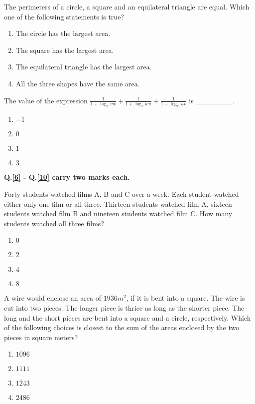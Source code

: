     \item The perimeters of a circle, a square and an equilateral triangle are equal. Which one of the following statements is true?
        \begin{enumerate}
            \item The circle has the largest area.
            \item The square has the largest area.
            \item The equilateral triangle has the largest area.
            \item All the three shapes have the same area.
        \end{enumerate}

    \item \label{5} The value of the expression $\frac{1}{1 + \log_u vw} + \frac{1}{1 + \log_v wu} + \frac{1}{1 + \log_w uv}$ is \_\_\_\_\_\_\_.
        \begin{enumerate}
            \item $-1$
            \item $0$
            \item $1$
            \item $3$
        \end{enumerate}

        \item[] \textbf{Q.\ref{6} - Q.\ref{10} carry two marks each.}
    \item \label{6} Forty students watched films A, B and C over a week. Each student watched either only one film or all three. Thirteen students watched film A, sixteen students watched film B and nineteen students watched film C. How many students watched all three films?
        \begin{enumerate}
            \item $0$
            \item $2$
            \item $4$
            \item $8$
        \end{enumerate}

    \item A wire would enclose an area of $1936 m^2$, if it is bent into a square. The wire is cut into two pieces. The longer piece is thrice as long as the shorter piece. The long and the short pieces are bent into a square and a circle, respectively. Which of the following choices is closest to the sum of the areas enclosed by the two pieces in square meters?
        \begin{enumerate}
            \item $1096$
            \item $1111$
            \item $1243$
            \item $2486$
        \end{enumerate}
    

